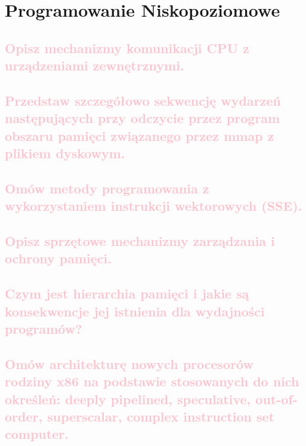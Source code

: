 \chapter{Programowanie Niskopoziomowe}

\section{\textcolor{pink}{Opisz mechanizmy komunikacji CPU z urządzeniami zewnętrznymi.}}

\section{\textcolor{pink}{Przedstaw szczegółowo sekwencję wydarzeń następujących przy odczycie przez program obszaru pamięci związanego przez mmap z plikiem dyskowym.}}

\section{\textcolor{pink}{Omów metody programowania z wykorzystaniem instrukcji wektorowych (SSE).}}

\section{\textcolor{pink}{Opisz sprzętowe mechanizmy zarządzania i ochrony pamięci.}}

\section{\textcolor{pink}{Czym jest hierarchia pamięci i jakie są konsekwencje jej istnienia dla wydajności programów?}}

\section{\textcolor{pink}{Omów architekturę nowych procesorów rodziny x86 na podstawie stosowanych do nich określeń: deeply pipelined, speculative, out-of-order, superscalar, complex instruction set computer.}}